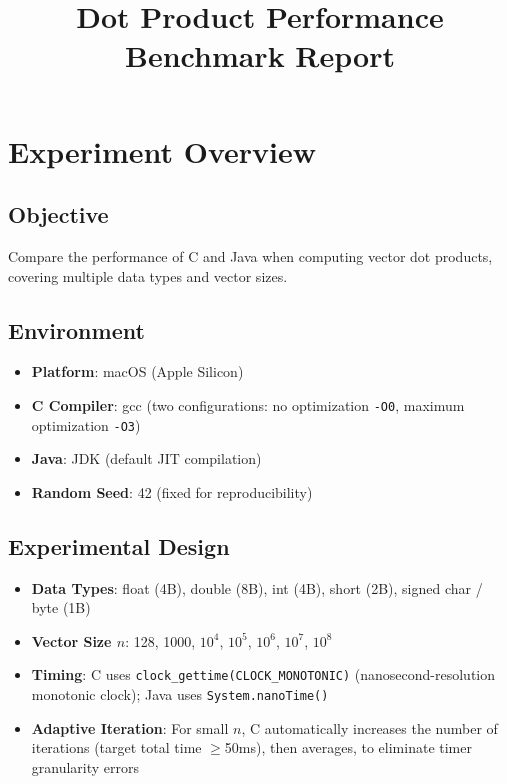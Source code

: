 \documentclass[12pt,a4paper]{article}
\title{\textbf{Dot Product Performance Benchmark Report}}
\author{}
\date{}
\begin{document}
\maketitle

\section{Experiment Overview}

\subsection{Objective}

Compare the performance of C and Java when computing vector dot products, covering multiple data types and vector sizes.

\subsection{Environment}

\begin{itemize}
  \item \textbf{Platform}: macOS (Apple Silicon)
  \item \textbf{C Compiler}: gcc (two configurations: no optimization \texttt{-O0}, maximum optimization \texttt{-O3})
  \item \textbf{Java}: JDK (default JIT compilation)
  \item \textbf{Random Seed}: 42 (fixed for reproducibility)
\end{itemize}

\subsection{Experimental Design}

\begin{itemize}
  \item \textbf{Data Types}: float (4B), double (8B), int (4B), short (2B), signed char / byte (1B)
  \item \textbf{Vector Size $n$}: 128, 1000, $10^4$, $10^5$, $10^6$, $10^7$, $10^8$
  \item \textbf{Timing}: C uses \texttt{clock\_gettime(CLOCK\_MONOTONIC)} (nanosecond-resolution monotonic clock); Java uses \texttt{System.nanoTime()}
  \item \textbf{Adaptive Iteration}: For small $n$, C automatically increases the number of iterations (target total time $\geq$50ms), then averages, to eliminate timer granularity errors
\end{itemize}
\end{document}
